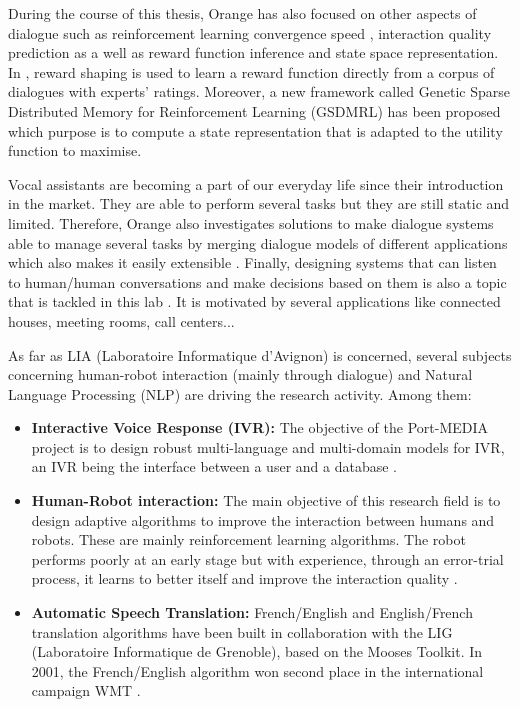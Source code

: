                 During the course of this thesis, Orange has also focused on other aspects of dialogue such as reinforcement learning convergence speed \cite{El-Asri2013a}, interaction quality prediction \cite{El-Asri2012,El-Asri2014d} as a well as reward function inference and state space representation. In \cite{El-Asri2012}, reward shaping is used to learn a reward function directly from a corpus of dialogues with experts' ratings. Moreover, a new framework called Genetic Sparse Distributed Memory for Reinforcement Learning (GSDMRL) has been proposed \cite{El-Asri2016} which purpose is to compute a state representation that is adapted to the utility function to maximise.
								
								Vocal assistants are becoming a part of our everyday life since their introduction in the market. They are able to perform several tasks but they are still static and limited. Therefore, Orange also investigates solutions to make dialogue systems able to manage several tasks by merging dialogue models of different applications which also makes it easily extensible \cite{EkeinhorKomi2014}. Finally, designing systems that can listen to human/human conversations and make decisions based on them is also a topic that is tackled in this lab \cite{Barlier2015}. It is motivated by several applications like connected houses, meeting rooms, call centers...

                As far as LIA (Laboratoire Informatique d'Avignon) is concerned, several subjects concerning human-robot interaction (mainly through dialogue) and Natural Language Processing (NLP) are driving the research activity. Among them:

                \begin{itemize}
                  \item \textbf{Interactive Voice Response (IVR):} The objective of the Port-MEDIA \cite{Lefevre2012} project is to design robust multi-language and multi-domain models for IVR, an IVR being the interface between a user and a database \cite{Jabaian2013,Jabaian2016}.
                  \item \textbf{Human-Robot interaction:} The main objective of this research field is to design adaptive algorithms to improve the interaction between humans and robots. These are mainly reinforcement learning algorithms. The robot performs poorly at an early stage but with experience, through an error-trial process, it learns to better itself and improve the interaction quality \cite{Ferreira2013,Ferreira2015c,Ferreira2015d}.
                  \item \textbf{Automatic Speech Translation:} French/English and English/French translation algorithms have been built in collaboration with the LIG (Laboratoire Informatique de Grenoble), based on the Mooses Toolkit. In 2001, the French/English algorithm won second place in the international campaign WMT \cite{Potet2011,Rubino2012,Huet2013}.
                \end{itemize}

